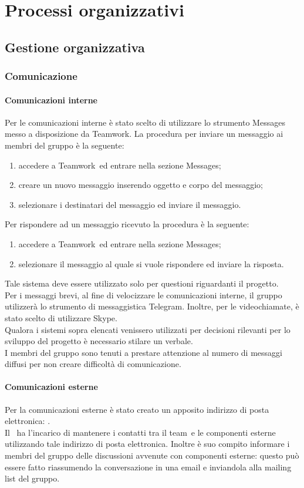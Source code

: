 \documentclass[../NormeProgetto.tex]{subfiles}
\begin{document}
\section{Processi organizzativi}
	\subsection{Gestione organizzativa}
	\subsubsection{Comunicazione}
		\paragraph{Comunicazioni interne}
			Per le comunicazioni interne è stato scelto di utilizzare lo strumento Messages messo a disposizione da Teamwork\g.
			La procedura per inviare un messaggio ai membri del gruppo è la seguente:
			\begin{enumerate}
				\item accedere a Teamwork\g\ ed entrare nella sezione Messages;
				\item creare un nuovo messaggio inserendo oggetto e corpo del messaggio;
				\item selezionare i destinatari del messaggio ed inviare il messaggio.
			\end{enumerate}
			Per rispondere ad un messaggio ricevuto la procedura è la seguente:
			\begin{enumerate}
				\item accedere a Teamwork\g\ ed entrare nella sezione Messages;
				\item selezionare il messaggio al quale si vuole rispondere ed inviare la risposta.
			\end{enumerate}
			 Tale sistema deve essere utilizzato solo per questioni riguardanti il progetto. \\
			Per i messaggi brevi, al fine di velocizzare le comunicazioni interne, il gruppo utilizzerà lo strumento di messaggistica Telegram\g. Inoltre, per le videochiamate, è stato scelto di utilizzare Skype\g. \\
			Qualora i sistemi sopra elencati venissero utilizzati per decisioni rilevanti per lo sviluppo del progetto è necessario stilare un verbale.\\
			I membri del gruppo sono tenuti a prestare attenzione al numero di messaggi diffusi per non creare difficoltà di comunicazione. 
		\paragraph{Comunicazioni esterne}
			Per la comunicazioni esterne è stato creato un apposito indirizzo di posta elettronica: \mailleaf. \\
			Il \responsabilediprogetto\ ha l'incarico di mantenere i contatti tra il team\g\ e le componenti esterne utilizzando tale indirizzo di posta elettronica. Inoltre è suo compito informare i membri del gruppo delle discussioni avvenute con componenti esterne: questo può essere fatto riassumendo la conversazione in una email e inviandola alla mailing list del gruppo.
\end{document}
